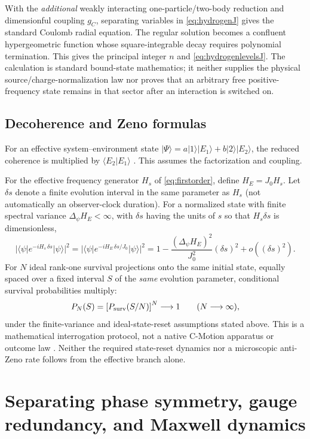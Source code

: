 \documentclass[11pt]{article}
\theoremstyle{definition}
\begin{document}
With the \emph{additional} weakly interacting one-particle/two-body reduction
and dimensionful coupling $g_C$, separating variables in \eqref{eq:hydrogenJ}
gives the standard Coulomb radial equation.  The regular solution becomes a
confluent hypergeometric function whose square-integrable decay requires
polynomial termination.  This gives the principal integer $n$ and
\eqref{eq:hydrogenlevelsJ}.  The calculation is standard bound-state mathematics;
it neither supplies the physical source/charge-normalization law nor proves
that an arbitrary free positive-frequency state remains in that sector after
an interaction is switched on.

\subsection{Decoherence and Zeno formulas}

For an effective system--environment state
$|\Psi\rangle=a|1\rangle|E_1\rangle+b|2\rangle|E_2\rangle$, the reduced coherence is multiplied
by $\langle E_2|E_1\rangle$ \cite{Zurek2003Decoherence}.  This assumes the factorization and
coupling.

For the effective frequency generator $H_s$ of \eqref{eq:firstorder}, define
$H_E=J_0H_s$.  Let $\delta s$ denote a finite evolution interval in the same parameter
as $H_s$ (not automatically an observer-clock duration).  For a normalized state with
finite spectral variance $\Delta_\psi H_E<\infty$, with $\delta s$ having
the units of $s$ so that $H_s\delta s$ is dimensionless,
\begin{equation}
 |\langle\psi|e^{-iH_s\,\delta s}|\psi\rangle|^2
 =|\langle\psi|e^{-iH_E\,\delta s/J_0}|\psi\rangle|^2
 =1-\frac{(\Delta_\psi H_E)^2}{J_0^2}(\delta s)^2+o((\delta s)^2).
\end{equation}
For $N$ ideal rank-one survival projections onto the same initial state,
equally spaced over a fixed interval $S$ of the \emph{same} evolution parameter,
conditional survival probabilities multiply:
\[
P_N(S)=\left[P_{\rm surv}(S/N)\right]^N\longrightarrow1
\qquad(N\longrightarrow\infty),
\]
under the finite-variance and ideal-state-reset assumptions stated above.
This is a mathematical interrogation protocol, not a native C-Motion
apparatus or outcome law \cite{MisraSudarshan1977}.  Neither the required
state-reset dynamics nor a microscopic anti-Zeno rate follows from the effective
branch alone.

\section{Separating phase symmetry, gauge redundancy, and Maxwell dynamics}
\label{app:gaugeguard}
\end{document}
